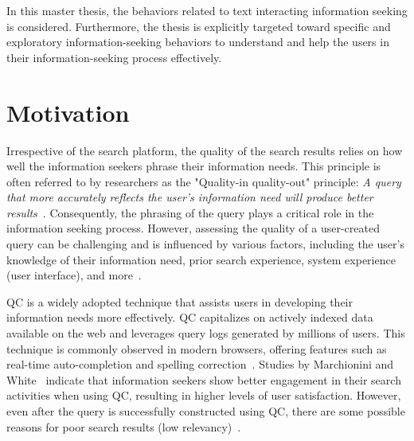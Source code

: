 In this master thesis, the behaviors related to text interacting information seeking is considered. Furthermore, the thesis is explicitly targeted toward specific and exploratory information-seeking behaviors to understand and help the users in their information-seeking process effectively.

\section{Motivation}

Irrespective of the search platform, the quality of the search results relies on how well the information seekers phrase their information needs. This principle is often referred to by researchers as the "Quality-in quality-out" principle: \textit{A query that more accurately reflects the user's information need will produce better results}~\cite{croft1987i3r}. Consequently, the phrasing of the query plays a critical role in the information seeking process. However, assessing the quality of a user-created query can be challenging and is influenced by various factors, including the user's knowledge of their information need, prior search experience, system experience (user interface), and more~\cite{marchionini2007find}.

 \ac{QC} is a widely adopted technique that assists users in developing their information needs more effectively. \ac{QC} capitalizes on actively indexed data available on the web and leverages query logs generated by millions of users. This technique is commonly observed in modern browsers, offering features such as real-time auto-completion and spelling correction~\cite{bast2006type, gaizauskas1998information}. Studies by Marchionini and White~\cite{marchionini2007find} indicate that information seekers show better engagement in their search activities when using \ac{QC}, resulting in higher levels of user satisfaction. However, even after the query is successfully constructed using \ac{QC}, there are some possible reasons for poor search results (low relevancy)~\cite{azad2019query}. 

